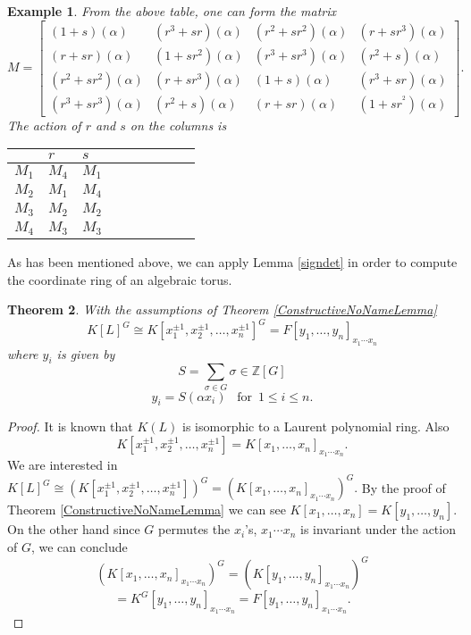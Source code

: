 \documentclass[12pt]{article}
\theoremstyle{plain}
\newtheorem{theorem}{Theorem}
\newtheorem{example}[theorem]{Example}
\newcommand{\Z}{\ensuremath{\mathbb{Z}}}
\begin{document}
\begin{example}
From the above table, one can form the matrix 
$$
M= \begin{bmatrix}
(1+s)(\alpha) & (r^3+sr)(\alpha) & (r^2+sr^2)(\alpha) & (r+sr^3)(\alpha)\\
(r+sr)(\alpha) & (1+sr^2)(\alpha) & (r^3+sr^3)(\alpha) & (r^2+s)(\alpha)\\
(r^2+sr^2)(\alpha) & (r+sr^3)(\alpha) & (1+s)(\alpha) & (r^3+sr)(\alpha)\\
(r^3+sr^3)(\alpha) & (r^2+s)(\alpha) & (r+sr)(\alpha) & (1+sr^^2)(\alpha)
\end{bmatrix}.
$$
The action of $r$ and $s$ on the columns is
\begin{table}[H]
\centering
\begin{tabular}{l|llllllll} 
 & $r$ & $s$ \\
 \hline
 $M_1$  & $M_4$ & $M_1$ \\
$M_2$ & $M_1$ & $M_4$ \\
$M_3$ & $M_2$ & $M_2$ \\
$M_4$ & $M_3$ & $M_3$ \\
\end{tabular}
\end{table}

\end{example} 

As has been mentioned above, we can apply Lemma \ref{signdet} in order to compute the coordinate ring of an algebraic torus. 
\begin{theorem}
With the assumptions of Theorem \ref{ConstructiveNoNameLemma} $$K[L]^G \cong K[x^{\pm 1}_1, x^{\pm 1}_2, \ldots , x^{\pm 1}_n]^G = F[y_1, \ldots , y_n]_{x_1\cdots x_n}$$ where $ y_i$ is given by $$S = \sum_{\sigma \in G} \sigma \in \Z[G]$$
$$y_i = S(\alpha x_i)  \,\,\,\,\, \text{for} \,\,\, 1\leq i \leq n.$$
\end{theorem}
\begin{proof}
It is known that $K(L)$ is isomorphic to a Laurent polynomial ring. Also $$K[x^{\pm 1}_1, x^{\pm 1}_2, \ldots , x^{\pm 1}_n] = K[x_1, \ldots , x_n]_{x_1\cdots x_n}.$$ We are interested in $K[L]^G \cong \left( K[x^{\pm 1}_1, x^{\pm 1}_2, \ldots , x^{\pm 1}_n] \right)^G = \left(K[x_1, \ldots , x_n]_{x_1\cdots x_n} \right) ^G.$ By the proof of Theorem \ref{ConstructiveNoNameLemma} we can see $K[x_1, \ldots , x_n] = K[y_1, \ldots , y_n]$. 
On the other hand since $G$ permutes the $x_i$'s, $x_1\cdots x_n$ is invariant under the action of $G$, we can conclude $$\left( K[x_1, \ldots , x_n]_{x_1\cdots x_n}\right)^G =  \left( K[y_1, \ldots , y_n]_{x_1\cdots x_n} \right)^G$$$$ = K^G [y_1, \ldots , y_n]_{x_1\cdots x_n} =  F[y_1, \ldots , y_n]_{x_1\cdots x_n}.$$ 
\end{proof}
\end{document}
